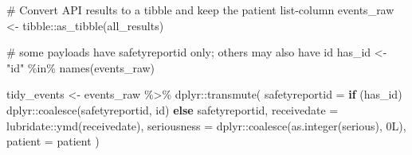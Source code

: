 \documentclass[
  letterpaper,
  DIV=11,
  numbers=noendperiod]{scrartcl}
\newenvironment{Shaded}{\begin{snugshade}}{\end{snugshade}}
\newcommand{\AttributeTok}[1]{\textcolor[rgb]{0.40,0.45,0.13}{#1}}
\newcommand{\CommentTok}[1]{\textcolor[rgb]{0.37,0.37,0.37}{#1}}
\newcommand{\ControlFlowTok}[1]{\textcolor[rgb]{0.00,0.23,0.31}{\textbf{#1}}}
\newcommand{\DecValTok}[1]{\textcolor[rgb]{0.68,0.00,0.00}{#1}}
\newcommand{\FunctionTok}[1]{\textcolor[rgb]{0.28,0.35,0.67}{#1}}
\newcommand{\NormalTok}[1]{\textcolor[rgb]{0.00,0.23,0.31}{#1}}
\newcommand{\OtherTok}[1]{\textcolor[rgb]{0.00,0.23,0.31}{#1}}
\newcommand{\SpecialCharTok}[1]{\textcolor[rgb]{0.37,0.37,0.37}{#1}}
\newcommand{\StringTok}[1]{\textcolor[rgb]{0.13,0.47,0.30}{#1}}
\begin{document}
\begin{Shaded}
\begin{Highlighting}[]
\CommentTok{\# Convert API results to a tibble and keep the patient list{-}column}
\NormalTok{events\_raw }\OtherTok{\textless{}{-}}\NormalTok{ tibble}\SpecialCharTok{::}\FunctionTok{as\_tibble}\NormalTok{(all\_results)}

\CommentTok{\# some payloads have safetyreportid only; others may also have id}
\NormalTok{has\_id }\OtherTok{\textless{}{-}} \StringTok{"id"} \SpecialCharTok{\%in\%} \FunctionTok{names}\NormalTok{(events\_raw)}

\NormalTok{tidy\_events }\OtherTok{\textless{}{-}}\NormalTok{ events\_raw }\SpecialCharTok{\%\textgreater{}\%}
\NormalTok{  dplyr}\SpecialCharTok{::}\FunctionTok{transmute}\NormalTok{(}
    \AttributeTok{safetyreportid =} \ControlFlowTok{if}\NormalTok{ (has\_id) dplyr}\SpecialCharTok{::}\FunctionTok{coalesce}\NormalTok{(safetyreportid, id) }\ControlFlowTok{else}\NormalTok{ safetyreportid,}
    \AttributeTok{receivedate    =}\NormalTok{ lubridate}\SpecialCharTok{::}\FunctionTok{ymd}\NormalTok{(receivedate),}
    \AttributeTok{seriousness    =}\NormalTok{ dplyr}\SpecialCharTok{::}\FunctionTok{coalesce}\NormalTok{(}\FunctionTok{as.integer}\NormalTok{(serious), }\DecValTok{0}\NormalTok{L),}
    \AttributeTok{patient        =}\NormalTok{ patient}
\NormalTok{  )}


\end{Highlighting}
\end{Shaded}
\end{document}
